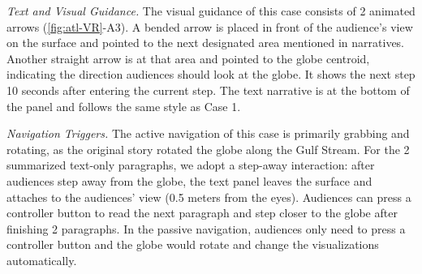 \textit{Text and Visual Guidance.} The visual guidance of this case consists of 2 animated arrows (\autoref{fig:atl-VR}-A3). A bended arrow is placed in front of the audience's view on the surface and pointed to the next designated area mentioned in narratives. Another straight arrow is at that area and pointed to the globe centroid, indicating the direction audiences should look at the globe. It shows the next step 10 seconds after entering the current step. The text narrative is at the bottom of the panel and follows the same style as Case 1.

\textit{Navigation Triggers.} The active navigation of this case is primarily grabbing and rotating, as the original story rotated the globe along the Gulf Stream. For the 2 summarized text-only paragraphs, we adopt a step-away interaction: after audiences step away from the globe, the text panel leaves the surface and attaches to the audiences' view (0.5 meters from the eyes). Audiences can press a controller button to read the next paragraph and step closer to the globe after finishing 2 paragraphs. In the passive navigation, audiences only need to press a controller button and the globe would rotate and change the visualizations automatically.

